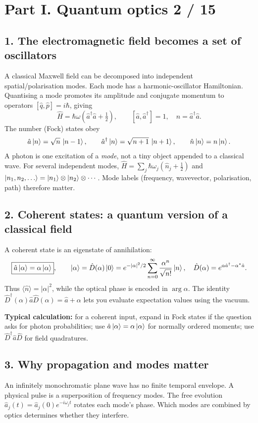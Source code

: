 
\section*{Part I. Quantum optics \hfill 2 / 15}
\subsection*{1. The electromagnetic field becomes a set of oscillators}
A classical Maxwell field can be decomposed into independent spatial/polarisation
modes. Each mode has a harmonic-oscillator Hamiltonian. Quantising a mode
promotes its amplitude and conjugate momentum to operators
\([\hat q,\hat p]=i\hbar\), giving
\[
\boxed{\hat H=\hbar\omega(\hat a^\dagger\hat a+\tfrac12)},\qquad
[\hat a,\hat a^\dagger]=1,\quad
\hat n=\hat a^\dagger\hat a.
\]
The number (Fock) states obey
\[
\hat a\left\lvert n\right\rangle=\sqrt n\,\left\lvert n-1\right\rangle,\qquad
\hat a^\dagger\left\lvert n\right\rangle=\sqrt{n+1}\,\left\lvert n+1\right\rangle,
\qquad \hat n\left\lvert n\right\rangle=n\left\lvert n\right\rangle.
\]
A photon is one excitation of a \emph{mode}, not a tiny object appended to a
classical wave. For several independent modes,
\(\hat H=\sum_j\hbar\omega_j(\hat n_j+\tfrac12)\) and
\(\left\lvert n_1,n_2,\ldots\right\rangle=\left\lvert n_1\right\rangle\otimes\left\lvert n_2\right\rangle\otimes\cdots\).
Mode labels (frequency, wavevector, polarisation, path) therefore matter.

\subsection*{2. Coherent states: a quantum version of a classical field}
A coherent state is an eigenstate of annihilation:
\[
\boxed{\hat a\left\lvert \alpha\right\rangle=\alpha\left\lvert \alpha\right\rangle},\qquad
\left\lvert \alpha\right\rangle=\hat D(\alpha)\left\lvert 0\right\rangle
=e^{-|\alpha|^2/2}\sum_{n=0}^\infty
\frac{\alpha^n}{\sqrt{n!}}\left\lvert n\right\rangle,
\quad
\hat D(\alpha)=e^{\alpha\hat a^\dagger-\alpha^*\hat a}.
\]
Thus \(\langle \hat n\rangle=|\alpha|^2\), while the optical phase is
encoded in \(\arg\alpha\). The identity
\(\hat D^\dagger(\alpha)\hat a\hat D(\alpha)=\hat a+\alpha\)
lets you evaluate expectation values using the vacuum.
\begin{methodbox}
\textbf{Typical calculation:} for a coherent input, expand in Fock states
if the question asks for photon probabilities; use
\(\hat a\left\lvert \alpha\right\rangle=\alpha\left\lvert \alpha\right\rangle\) for normally ordered moments;
use \(\hat D^\dagger\hat a\hat D\) for field quadratures.
\end{methodbox}
\subsection*{3. Why propagation and modes matter}
An infinitely monochromatic plane wave has no finite temporal envelope.
A physical pulse is a superposition of frequency modes. The free evolution
\(\hat a_j(t)=\hat a_j(0)e^{-i\omega_jt}\) rotates each mode's phase.
Which modes are combined by optics determines whether they interfere.

